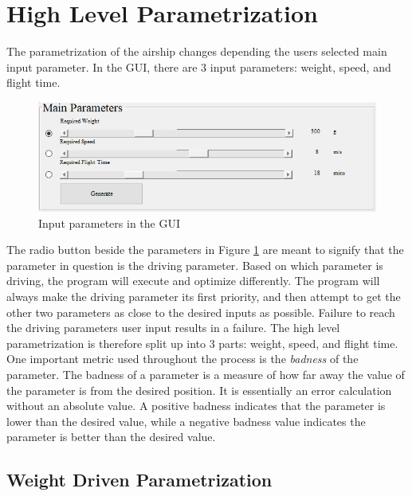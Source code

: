 \documentclass[../main.tex]{subfiles}
\begin{document}
\section{High Level Parametrization} \label{highLevel}
The parametrization of the airship changes depending the users selected main input parameter. In the GUI, there are 3 input parameters: weight, speed, and flight time.

\begin{figure}[H]
	\centering
	\includegraphics[width=\linewidth]{img/paramaterization/userInputs.PNG}
	\caption{Input parameters in the GUI}
	\label{fig:userInputs}
\end{figure}

The radio button beside the parameters in Figure \ref{fig:userInputs} are meant to signify that the parameter in question is the driving parameter. Based on which parameter is driving, the program will execute and optimize differently. The program will always make the driving parameter its first priority, and  then attempt to get the other two parameters as close to the desired inputs as possible. Failure to reach the driving parameters user input results in a failure. The high level parametrization is therefore split up into 3 parts: weight, speed, and flight time.\\

One important metric used throughout the process is the \textit{badness} of the parameter. The badness of a parameter is a measure of how far away the value of the parameter is from the desired position. It is essentially an error calculation without an absolute value. A positive badness indicates that the parameter is lower than the desired value, while a negative badness value indicates the parameter is better than the desired value.

\subsection{Weight Driven Parametrization}
\end{document}
